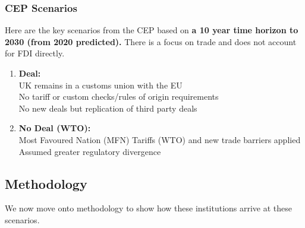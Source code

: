 \documentclass[12pt, letterpaper]{article}
\begin{document}
\subsubsection{CEP Scenarios}
Here are the key scenarios from the CEP based on \textbf{a 10 year time horizon to 2030 (from 2020 predicted).} There is a focus on trade and does not account for FDI directly.
\begin{enumerate}
	\item \textbf{Deal:}\\ 
		UK remains in a customs union with the EU\\
		No tariff or custom checks/rules of origin requirements\\
		No new deals but replication of third party deals
	\item \textbf{No Deal (WTO):}\\
		Most Favoured Nation (MFN) Tariffs (WTO) and new trade barriers applied\\
		Assumed greater regulatory divergence
\end{enumerate}

\subsection{Methodology}
We now move onto methodology to show how these institutions arrive at these scenarios.
\end{document}

